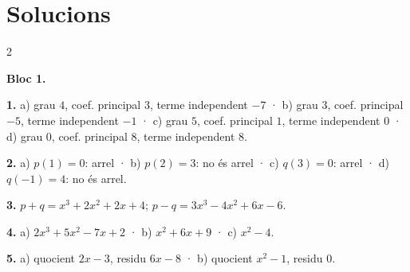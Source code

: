 \documentclass[13pt,a4paper]{extarticle}
\begin{document}
\section*{Solucions}
\small\begin{multicols}{2}

\textbf{Bloc 1.}\par
\par\noindent\begin{minipage}{\linewidth}
\textbf{1.} a) grau $4$, coef. principal $3$, terme independent $-7$ · b) grau $3$, coef. principal $-5$, terme independent $-1$ · c) grau $5$, coef. principal $1$, terme independent $0$ · d) grau $0$, coef. principal $8$, terme independent $8$.\par
\end{minipage}\par\vspace{1.6mm}
\par\noindent\begin{minipage}{\linewidth}
\textbf{2.} a) $p(1)=0$: arrel · b) $p(2)=3$: no és arrel · c) $q(3)=0$: arrel · d) $q(-1)=4$: no és arrel.\par
\end{minipage}\par\vspace{1.6mm}
\par\noindent\begin{minipage}{\linewidth}
\textbf{3.} $p+q=x^3+2x^2+2x+4$; $p-q=3x^3-4x^2+6x-6$.\par
\end{minipage}\par\vspace{1.6mm}
\par\noindent\begin{minipage}{\linewidth}
\textbf{4.} a) $2x^3+5x^2-7x+2$ · b) $x^2+6x+9$ · c) $x^2-4$.\par
\end{minipage}\par\vspace{1.6mm}
\par\noindent\begin{minipage}{\linewidth}
\textbf{5.} a) quocient $2x-3$, residu $6x-8$ · b) quocient $x^2-1$, residu $0$.\par
\end{minipage}\par\vspace{1.6mm}
\par\noindent\begin{minipage}{\linewidth}

\end{minipage}
\end{multicols}
\end{document}
